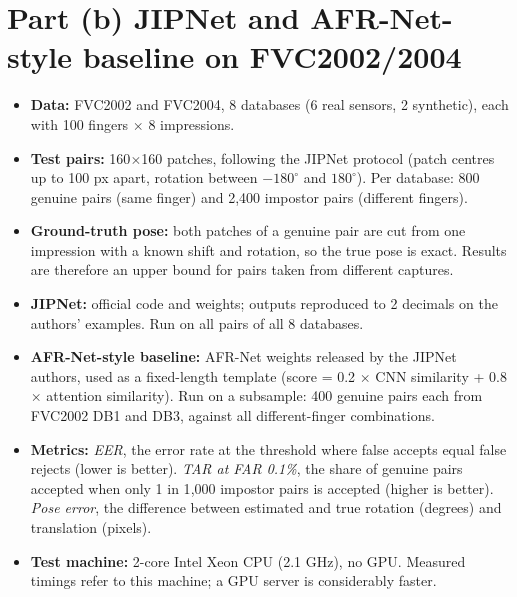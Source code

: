 \documentclass[10pt,a4paper]{article}
\begin{document}
\section*{Part (b) \textperiodcentered{} JIPNet and AFR-Net-style baseline on FVC2002/2004}
\begin{itemize}
\item \textbf{Data:} FVC2002 and FVC2004, 8 databases (6 real sensors, 2 synthetic), each with 100 fingers $\times$ 8 impressions.
\item \textbf{Test pairs:} 160$\times$160 patches, following the JIPNet protocol (patch centres up to 100 px apart, rotation between $-180^\circ$ and $180^\circ$). Per database: 800 genuine pairs (same finger) and 2{,}400 impostor pairs (different fingers).
\item \textbf{Ground-truth pose:} both patches of a genuine pair are cut from one impression with a known shift and rotation, so the true pose is exact. Results are therefore an upper bound for pairs taken from different captures.
\item \textbf{JIPNet:} official code and weights; outputs reproduced to 2 decimals on the authors' examples. Run on all pairs of all 8 databases.
\item \textbf{AFR-Net-style baseline:} AFR-Net weights released by the JIPNet authors, used as a fixed-length template (score = 0.2 $\times$ CNN similarity + 0.8 $\times$ attention similarity). Run on a subsample: 400 genuine pairs each from FVC2002 DB1 and DB3, against all different-finger combinations.
\item \textbf{Metrics:} \emph{EER}, the error rate at the threshold where false accepts equal false rejects (lower is better). \emph{TAR at FAR 0.1\%}, the share of genuine pairs accepted when only 1 in 1{,}000 impostor pairs is accepted (higher is better). \emph{Pose error}, the difference between estimated and true rotation (degrees) and translation (pixels).
\item \textbf{Test machine:} 2-core Intel Xeon CPU (2.1 GHz), no GPU. Measured timings refer to this machine; a GPU server is considerably faster.
\end{itemize}
\end{document}
